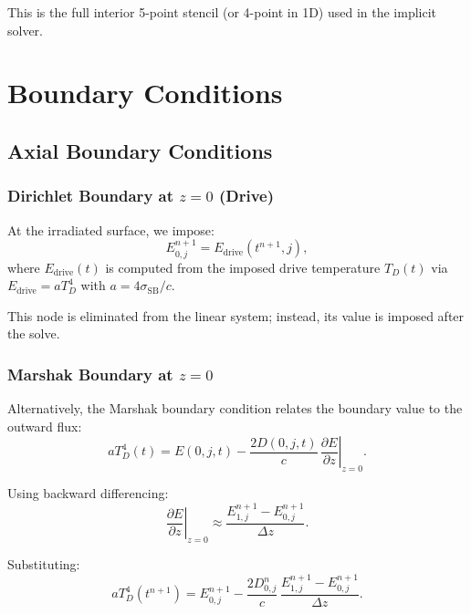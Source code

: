 \documentclass[12pt,oneside]{article}
\begin{document}
This is the full interior 5-point stencil (or 4-point in 1D) used in the implicit solver.

\section{Boundary Conditions}

\subsection{Axial Boundary Conditions}

\subsubsection{Dirichlet Boundary at $z = 0$ (Drive)}

At the irradiated surface, we impose:
\begin{equation}
E^{n+1}_{0,j} = E_{\mathrm{drive}}(t^{n+1}, j),
\end{equation}
where $E_{\mathrm{drive}}(t)$ is computed from the imposed drive temperature $T_D(t)$ via $E_{\mathrm{drive}} = a T_D^4$ with $a = 4\sigma_{\mathrm{SB}}/c$.

This node is eliminated from the linear system; instead, its value is imposed after the solve.

\subsubsection{Marshak Boundary at $z = 0$}

Alternatively, the Marshak boundary condition relates the boundary value to the outward flux:
\begin{equation}
a T_D^4(t) = E(0,j,t) - \frac{2D(0,j,t)}{c}\,\left.\frac{\partial E}{\partial z}\right|_{z=0}.
\end{equation}

Using backward differencing:
\begin{equation}
\left.\frac{\partial E}{\partial z}\right|_{z=0}
\approx
\frac{E_{1,j}^{n+1} - E_{0,j}^{n+1}}{\Delta z}.
\end{equation}

Substituting:
\begin{equation}
a T_D^4(t^{n+1})
=
E_{0,j}^{n+1} - \frac{2D^n_{0,j}}{c}\,\frac{E_{1,j}^{n+1} - E_{0,j}^{n+1}}{\Delta z}.
\end{equation}
\end{document}
